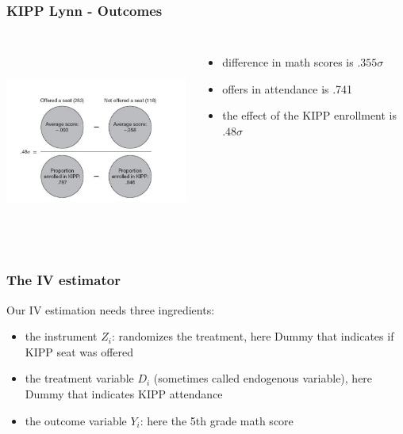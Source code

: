 \documentclass{beamer}
\begin{document}
\begin{frame}
\frametitle{KIPP Lynn - Outcomes}
\begin{columns}
\includegraphics[width=6.5cm,height=6.5cm,keepaspectratio]{Figure 3.2} 

\begin{itemize}
	\item difference in math scores is $.355\sigma$
	\item offers in attendance is .741
	\item the effect of the KIPP enrollment is $.48\sigma$
\end{itemize}

\end{columns}

\end{frame}

\begin{frame}
\frametitle{The IV estimator}
Our IV estimation needs three ingredients:
\begin{itemize}
	\item the instrument $Z_i$: randomizes the treatment, here Dummy that indicates if KIPP seat was offered
	\item the treatment variable $D_i$ (sometimes called endogenous variable), here Dummy that indicates KIPP attendance
	\item the outcome variable $Y_i$: here the 5th grade math score
\end{itemize}



\end{frame}
\end{document}
